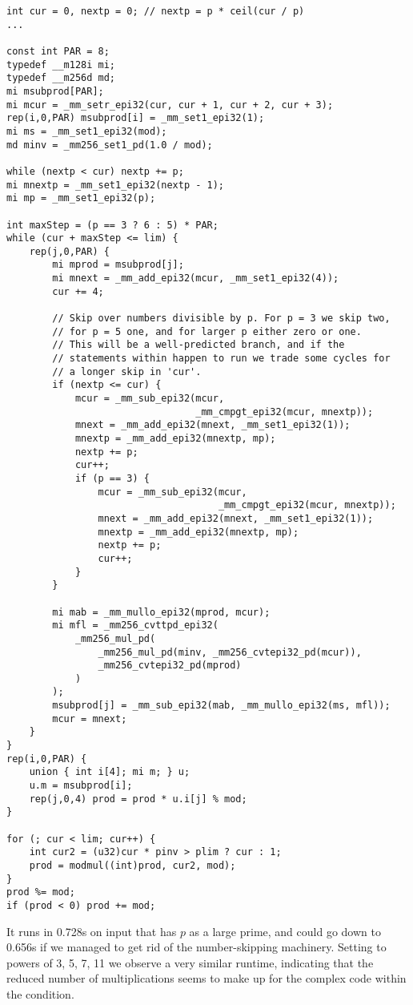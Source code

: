 \begin{lstlisting}
int cur = 0, nextp = 0; // nextp = p * ceil(cur / p)
...

const int PAR = 8;
typedef __m128i mi;
typedef __m256d md;
mi msubprod[PAR];
mi mcur = _mm_setr_epi32(cur, cur + 1, cur + 2, cur + 3);
rep(i,0,PAR) msubprod[i] = _mm_set1_epi32(1);
mi ms = _mm_set1_epi32(mod);
md minv = _mm256_set1_pd(1.0 / mod);

while (nextp < cur) nextp += p;
mi mnextp = _mm_set1_epi32(nextp - 1);
mi mp = _mm_set1_epi32(p);

int maxStep = (p == 3 ? 6 : 5) * PAR;
while (cur + maxStep <= lim) {
	rep(j,0,PAR) {
		mi mprod = msubprod[j];
		mi mnext = _mm_add_epi32(mcur, _mm_set1_epi32(4));
		cur += 4;

		// Skip over numbers divisible by p. For p = 3 we skip two,
		// for p = 5 one, and for larger p either zero or one.
		// This will be a well-predicted branch, and if the
		// statements within happen to run we trade some cycles for
		// a longer skip in 'cur'.
		if (nextp <= cur) {
			mcur = _mm_sub_epi32(mcur,
			                     _mm_cmpgt_epi32(mcur, mnextp));
			mnext = _mm_add_epi32(mnext, _mm_set1_epi32(1));
			mnextp = _mm_add_epi32(mnextp, mp);
			nextp += p;
			cur++;
			if (p == 3) {
				mcur = _mm_sub_epi32(mcur,
				                     _mm_cmpgt_epi32(mcur, mnextp));
				mnext = _mm_add_epi32(mnext, _mm_set1_epi32(1));
				mnextp = _mm_add_epi32(mnextp, mp);
				nextp += p;
				cur++;
			}
		}

		mi mab = _mm_mullo_epi32(mprod, mcur);
		mi mfl = _mm256_cvttpd_epi32(
			_mm256_mul_pd(
				_mm256_mul_pd(minv, _mm256_cvtepi32_pd(mcur)),
				_mm256_cvtepi32_pd(mprod)
			)
		);
		msubprod[j] = _mm_sub_epi32(mab, _mm_mullo_epi32(ms, mfl));
		mcur = mnext;
	}
}
rep(i,0,PAR) {
	union { int i[4]; mi m; } u;
	u.m = msubprod[i];
	rep(j,0,4) prod = prod * u.i[j] % mod;
}

for (; cur < lim; cur++) {
	int cur2 = (u32)cur * pinv > plim ? cur : 1;
	prod = modmul((int)prod, cur2, mod);
}
prod %= mod;
if (prod < 0) prod += mod;
\end{lstlisting}

It runs in 0.728s on input that has $p$ as a large prime,
and could go down to 0.656s if we managed to get rid of the number-skipping machinery.
Setting \verb@mod@ to powers of 3, 5, 7, 11 we observe a very similar runtime, indicating that the reduced number of multiplications seems to make up for the complex code within the condition.

